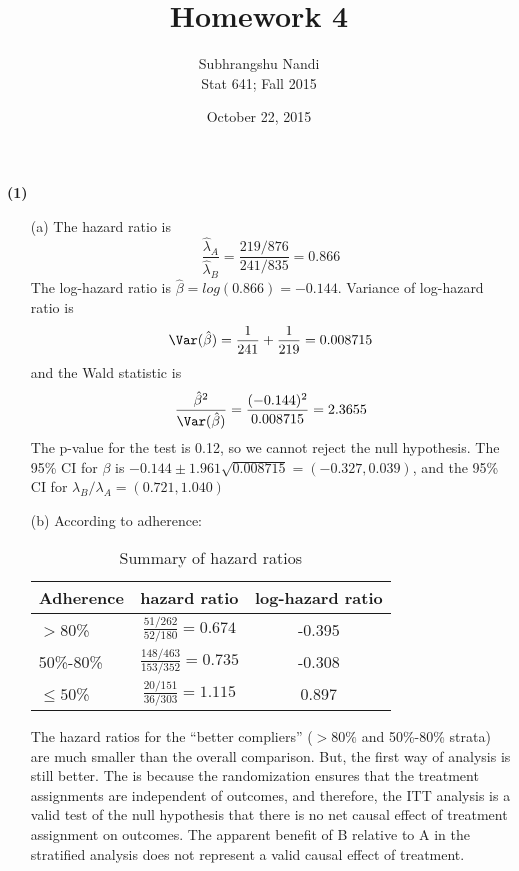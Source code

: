 \documentclass[11pt,a4paper]{article}
\begin{document}
\title{Homework 4}
\author{Subhrangshu Nandi\\
  Stat 641; Fall 2015}
\date{October 22, 2015}

\maketitle

\noindent
\textbf{(1)} 
\begin{enumerate}
\item[(a)]
The hazard ratio is $$ \frac{\hat{\lambda}_A}{\hat{\lambda}_B} = \frac{219/876}{241/835} = 0.866$$ The log-hazard ratio is $\hat{\beta}= log(0.866) = -0.144$. Variance of log-hazard ratio is
$$ \Var(\hat{\beta}) = \frac{1}{241} + \frac{1}{219} = 0.008715$$ and the Wald statistic is
$$ \frac{\hat{\beta}^2}{\Var(\hat{\beta})} = \frac{(-0.144)^2}{0.008715} = 2.3655 $$
The p-value for the test is 0.12, so we cannot reject the null hypothesis. 
The 95\% CI for $\beta$ is $-0.144 \pm 1.961\sqrt{0.008715} = (−0.327, 0.039)$, and the 95\% CI for $\lambda_B/\lambda_A = (0.721, 1.040)$

\item[(b)]
According to adherence:
\begin{table}[H]
\centering
\begin{tabular}{lcc}
  \hline
Adherence & hazard ratio & log-hazard ratio \\ 
  \hline
 $>80$\% 	& $\frac{51/262}{52/180} = 0.674$ 	& -0.395 \\
 50\%-80\%  	& $\frac{148/463}{153/352} = 0.735 $ 	& -0.308 \\
 $\leq 50$\% 	& $\frac{20/151}{36/303} = 1.115$ 	& 0.897\\
   \hline
\end{tabular}
\caption{Summary of hazard ratios}
\end{table}
The hazard ratios for the “better compliers” ($> 80\%$ and 50\%-80\% strata) are much smaller than the overall comparison. But, the first way of analysis is still better. The is because the randomization ensures that the treatment assignments are independent of outcomes, and therefore, the ITT analysis is a valid test of the null hypothesis that there is no net causal effect of treatment assignment on outcomes. The apparent benefit of B relative to A in the stratified analysis does not represent a valid causal effect of treatment.
\end{enumerate}
\end{document}
